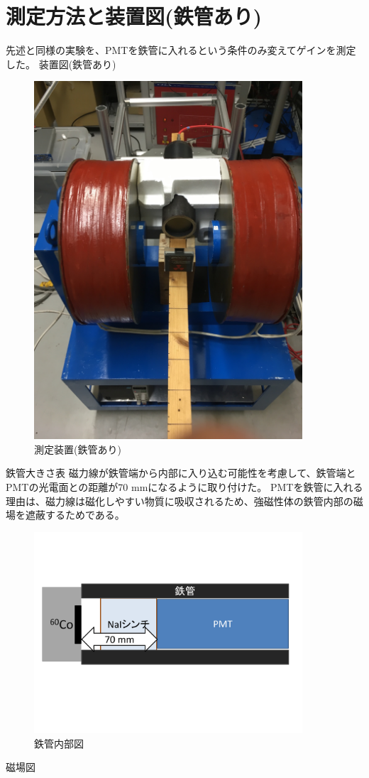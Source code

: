 \section{測定方法と装置図(鉄管あり)}
先述と同様の実験を、PMTを鉄管に入れるという条件のみ変えてゲインを測定した。
装置図(鉄管あり)
\begin{figure}[H]
	\centering
		\includegraphics[width=10cm]{fig/iguchi/2inchinFe.jpg}
	\caption{測定装置(鉄管あり)}
	\label{2inchinFe}
\end{figure}

鉄管大きさ表
磁力線が鉄管端から内部に入り込む可能性を考慮して、鉄管端とPMTの光電面との距離が70 mmになるように取り付けた。
PMTを鉄管に入れる理由は、磁力線は磁化しやすい物質に吸収されるため、強磁性体の鉄管内部の磁場を遮蔽するためである。
\begin{figure}[H]
	\centering
		\includegraphics[width=10cm]{fig/iguchi/PMTinFe.pdf}
	\caption{鉄管内部図}
	\label{PMTinFe}
\end{figure}
磁場図

